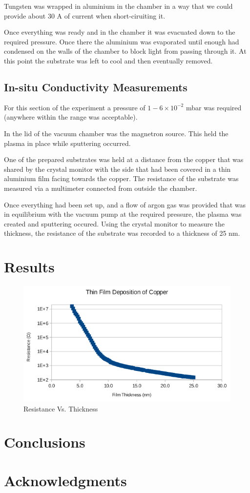 \documentclass[aps,prl,twocolumn,groupedaddress,showkeys]{revtex4}
\begin{document}
Tungsten was wrapped in aluminium in the chamber in a way that we could provide about 30 A of current when short-ciruiting it.

Once everything was ready and in the chamber it was evacuated down to the required pressure. Once there the aluminium was evaporated until enough had condensed on the walls of the chamber to block light from passing through it. At this point the substrate was left to cool and then eventually removed.


\subsection{In-situ Conductivity Measurements}

For this section of the experiment a pressure of $1-6\times10^{-2}$ mbar was required (anywhere within the range was acceptable).

In the lid of the vacuum chamber was the magnetron source. This held the plasma in place while sputtering occurred.

One of the prepared substrates was held at a distance from the copper that was shared by the crystal monitor with the side that had been covered in a thin aluminium film facing towards the copper. The resistance of the substrate was measured via a multimeter connected from outside the chamber.

Once everything had been set up, and a flow of argon gas was provided that was in equilibrium with the vacuum pump at the required pressure, the plasma was created and sputtering occured. Using the crystal monitor to measure the thickness, the resistance of the substrate was recorded to a thickness of 25 nm.


\section{Results}

\begin{figure}[h]
	\includegraphics[width=\linewidth]{copperSputtering.png}
	\caption{Resistance Vs. Thickness}
	\label{fig:copperSputtering}
\end{figure}


\section{Conclusions}

\section{Acknowledgments}
\end{document}
